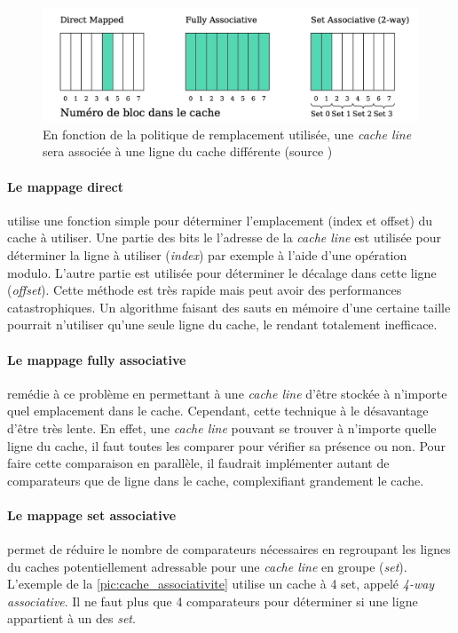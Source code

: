 \begin{figure}
    \center
    \includegraphics[width=12cm]{images/cache_associativite.png}
    \caption{\label{pic:cache_associativite} En fonction de la politique de remplacement utilisée, une \textit{cache line} sera associée à une ligne du cache différente (source \cite{Meunier2017})}
\end{figure}

\paragraph{Le mappage direct} utilise une fonction simple pour déterminer l'emplacement (index et offset) du cache à utiliser. Une partie des bits le l'adresse de la \textit{cache line} est utilisée pour déterminer la ligne à utiliser (\textit{index}) par exemple à l'aide d'une opération modulo. L'autre partie est utilisée pour déterminer le décalage dans cette ligne (\textit{offset}). Cette méthode est très rapide mais peut avoir des performances catastrophiques. Un algorithme faisant des sauts en mémoire d'une certaine taille pourrait n'utiliser qu'une seule ligne du cache, le rendant totalement inefficace.

\paragraph{Le mappage fully associative} remédie à ce problème en permettant à une \textit{cache line} d'être stockée à n'importe quel emplacement dans le cache. Cependant, cette technique à le désavantage d'être très lente. En effet, une \textit{cache line} pouvant se trouver à n'importe quelle ligne du cache, il faut toutes les comparer pour vérifier sa présence ou non. Pour faire cette comparaison en parallèle, il faudrait implémenter autant de comparateurs que de ligne dans le cache, complexifiant grandement le cache.


\paragraph{Le mappage set associative } permet de réduire le nombre de comparateurs nécessaires en regroupant les lignes du caches potentiellement adressable pour une \textit{cache line} en groupe (\textit{set}). L'exemple de la \autoref{pic:cache_associativite} utilise un cache à 4 set, appelé \textit{4-way associative}. Il ne faut plus que 4 comparateurs pour déterminer si une ligne appartient à un des \textit{set}.


